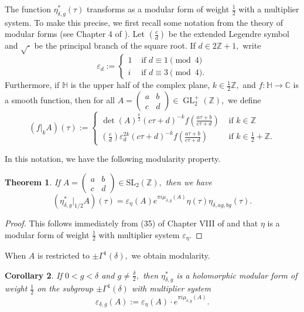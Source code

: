 \documentclass[10pt]{amsart}
\newtheorem{theorem}{Theorem}[section]
\newtheorem{corollary}[theorem]{Corollary}
\theoremstyle{definition}
\theoremstyle{remark}
\numberwithin{equation}{section}
\DeclareMathOperator{\GL}{GL}
\newcommand{\leg}[2]{\genfrac{(}{)}{}{}{#1}{#2}}
\newcommand{\HH}{\mathbb H}
\newcommand{\C}{\mathbb C}
\newcommand{\SL}{\mathrm{SL}}
\newcommand{\Z}{\mathbb Z}
\begin{document}
	The function $\eta_{\delta,g}^\ast(\tau)$ transforms as a modular form of weight $\frac{1}{2}$ with a multiplier system. To make this precise, we first recall some notation from the theory of modular forms (see Chapter 4 of \cite{HMFBook}). Let $\leg{c}{d}$ be the extended Legendre symbol and $\sqrt{\cdot}$ be the principal branch of the square root. If $d\in 2\Z+1,$ write
	$$
	\varepsilon_d:=\begin{cases}
		1 & \text{ if }d\equiv 1\pmod 4 \\
		i & \text{ if }d\equiv 3\pmod 4.
	\end{cases}
	$$ Furthermore, if $\mathbb{H}$ is the upper half of the complex plane, $k\in\frac{1}{2}\Z,$ and $f:\HH\to\C$ is a smooth function, then for all $A=\begin{pmatrix}
		a & b \\
		c & d
	\end{pmatrix}\in\GL_2^+(\Z),$ we define
	$$
	(f|_k A)(\tau):=\begin{cases}
		\det(A)^{\frac{k}{2}}(c\tau+d)^{-k}f\left(\frac{a\tau+b}{c\tau+d}\right) & \text{ if }k\in\Z \\
		\leg{c}{d}\varepsilon_d^{2k}(c\tau+d)^{-k}f\left(\frac{a\tau+b}{c\tau+d}\right) & \text{ if }k\in\frac{1}{2}+\Z.
	\end{cases}
	$$
	
	In this notation, we have the following modularity property.
	
	\begin{theorem}\label{thm:EtaTrans}
		If $A=\begin{pmatrix}
			a & b \\
			c & d
		\end{pmatrix}\in\SL_2(\Z),$ then we have
		$$
		(\eta^{\ast}_{\delta,g}|_{1/2}A)(\tau)=\varepsilon_\eta(A)e^{\pi i\mu_{\delta,g}(A)}\eta(\tau)\eta_{\delta,ag,bg}(\tau).
		$$
	\end{theorem}
	
	\begin{proof}
		This follows immediately from (35) of Chapter VIII of \cite{Schoenberg} and that $\eta$ is a modular form of weight $\frac{1}{2}$ with multiplier system $\varepsilon_\eta.$
	\end{proof}
	
	When $A$ is restricted to $\pm\Gamma^1(\delta),$ we obtain modularity.
	
	\begin{corollary}\label{cor:EtaTransSpec}
		If $0<g<\delta$ and $g\neq\frac{\delta}{2},$ then $\eta^\ast_{\delta,g}$ is a holomorphic modular form of weight $\frac{1}{2}$ on the  subgroup 
		$
		\pm\Gamma^1(\delta)
		$
		with multiplier system
		$$
		\varepsilon_{\delta,g}(A):=\varepsilon_\eta(A)\cdot e^{\pi i\mu_{\delta,g}(A)}.
		$$
	\end{corollary}
	
\end{document}
